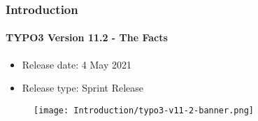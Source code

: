 %

\begin{frame}[fragile]
	\frametitle{Introduction}
	\framesubtitle{TYPO3 Version 11.2 - The Facts}

	\begin{itemize}
		\item Release date: 4 May 2021
		\item Release type: Sprint Release
	\end{itemize}

	\begin{figure}
		\texttt{[image: Introduction/typo3-v11-2-banner.png]}
	\end{figure}

\end{frame}

